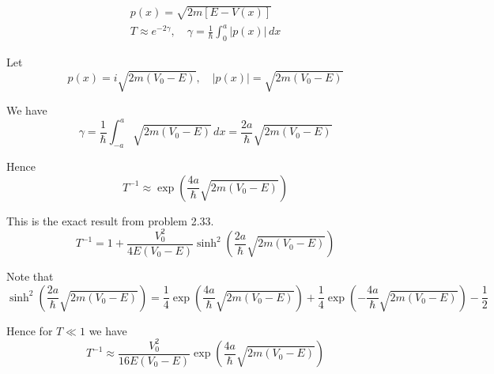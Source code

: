 


\begin{gather*}
p(x)=\sqrt{2m[E-V(x)]}\tag{9.2}
\\
T\approx e^{-2\gamma},\quad\gamma=\frac{1}{\hbar}
\int_0^a|p(x)|\,dx\tag{9.23}
\end{gather*}

Let
\begin{equation*}
p(x)=i\sqrt{2m(V_0-E)},\quad|p(x)|=\sqrt{2m(V_0-E)}
\end{equation*}

We have
\begin{equation*}
\gamma=\frac{1}{\hbar}\int_{-a}^a\sqrt{2m(V_0-E)}\,dx=\frac{2a}{\hbar}\sqrt{2m(V_0-E)}
\end{equation*}

Hence
\begin{equation*}
T^{-1}\approx\exp\left(\frac{4a}{\hbar}\sqrt{2m(V_0-E)}\right)\tag{1}
\end{equation*}

This is the exact result from problem 2.33.
\begin{equation*}
T^{-1}=1+\frac{V_0^2}{4E(V_0-E)}\sinh^2\left(\frac{2a}{\hbar}\sqrt{2m(V_0-E)}\right)
\end{equation*}

Note that
\begin{equation*}
\sinh^2\left(\frac{2a}{\hbar}\sqrt{2m(V_0-E)}\right)
=\frac{1}{4}\exp\left(\frac{4a}{\hbar}\sqrt{2m(V_0-E)}\right)
+\frac{1}{4}\exp\left(-\frac{4a}{\hbar}\sqrt{2m(V_0-E)}\right)-\frac{1}{2}
\end{equation*}

Hence for $T\ll1$ we have
\begin{equation*}
T^{-1}\approx\frac{V_0^2}{16E(V_0-E)}\exp\left(\frac{4a}{\hbar}\sqrt{2m(V_0-E)}\right)
\end{equation*}


